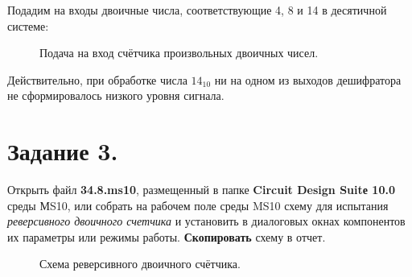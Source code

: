 \documentclass[spec, och, otchet, hidelinks]{SCWorks}
\begin{document}
\par Подадим на входы двоичные числа, соответствующие 4, 8 и 14 в десятичной системе:

\begin{figure}[h]
	\caption{Подача на вход счётчика произвольных двоичных чисел.}
\end{figure}

Действительно, при обработке числа $ 14_{10} $ ни на одном из выходов дешифратора не сформировалось низкого уровня сигнала. 

\newpage

\section*{Задание 3.}

Открыть файл \textbf{34.8.ms10}, размещенный в папке \textbf{Circuit Design Suitе 10.0} среды МS10, или собрать на рабочем поле среды MS10 схему для 
испытания \textit{реверсивного двоичного счетчика} и установить в диалоговых окнах компонентов их параметры или режимы работы. \textbf{Скопировать} схему в отчет.

\begin{figure}[h]
	\caption{Схема реверсивного двоичного счётчика.}
\end{figure}
\end{document}
